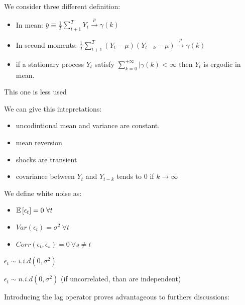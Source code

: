 \begin{mydefinition}[Ergodicity]
We consider three different definition:
\begin{itemize}
	\item In mean: $\bar{y} \equiv \frac{1}{T} \sum_{t+1}^{T} Y_t \xrightarrow{p} \gamma(k)$
	\item In second moments: $\frac{1}{T} \sum_{t+1}^{T} (Y_t - \mu) (Y_{t-k} - \mu) \xrightarrow{p} \gamma(k)$
	\item if a stationary process $Y_t$ satisfy $\sum_{k=0}^{+ \infty} |\gamma(k) <\infty$ then $Y_t$ is ergodic in mean.\\
\end{itemize} 
This one is less used 
\end{mydefinition}
We can give this intepretations:
\begin{itemize}
	\item uncodintional mean and variance are constant.
	\item mean reversion
	\item shocks are transient
	\item covariance between $Y_t$ and $Y_{t-k}$ tends to 0 if $k \to \infty$
\end{itemize}
\newpage
We define white noise as:
\begin{mydefinition}
	\begin{itemize}
		\item $\mathbb{E}\left[\epsilon_t\right] = 0 \ \forall t$
		\item $Var(\epsilon_t) = \sigma^2 \ \forall t $
		\item $Corr(\epsilon_t, \epsilon_s) = 0 \ \forall s \neq t$
	\end{itemize}
\end{mydefinition}

\begin{mydefinition}
	$\epsilon_t \sim i.i.d(0,\sigma^2)$
\end{mydefinition}

\begin{mydefinition}[ Gaussian (weak = strong)]
		$\epsilon_t \sim n.i.d (0, \sigma^2)$ (if uncorrelated, than are independent)
\end{mydefinition}
Introducing the lag operator proves advantageous to furthers discussions:

